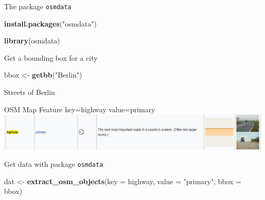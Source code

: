 \documentclass[
  ignorenonframetext,
]{beamer}
\newenvironment{Shaded}{\begin{snugshade}}{\end{snugshade}}
\newcommand{\DataTypeTok}[1]{\textcolor[rgb]{0.13,0.29,0.53}{#1}}
\newcommand{\KeywordTok}[1]{\textcolor[rgb]{0.13,0.29,0.53}{\textbf{#1}}}
\newcommand{\NormalTok}[1]{#1}
\newcommand{\StringTok}[1]{\textcolor[rgb]{0.31,0.60,0.02}{#1}}
\begin{document}
\begin{frame}[fragile]{The package \texttt{osmdata}}
\protect\hypertarget{the-package-osmdata}{}
\begin{Shaded}
\begin{Highlighting}[]
\KeywordTok{install.packages}\NormalTok{(}\StringTok{"osmdata"}\NormalTok{)}
\end{Highlighting}
\end{Shaded}

\begin{Shaded}
\begin{Highlighting}[]
\KeywordTok{library}\NormalTok{(osmdata)}
\end{Highlighting}
\end{Shaded}

\begin{block}{Get a bounding box for a city}
\protect\hypertarget{get-a-bounding-box-for-a-city}{}
\begin{Shaded}
\begin{Highlighting}[]
\NormalTok{bbox \textless{}{-}}\StringTok{ }\KeywordTok{getbb}\NormalTok{(}\StringTok{"Berlin"}\NormalTok{)}
\end{Highlighting}
\end{Shaded}
\end{block}
\end{frame}

\begin{frame}[fragile]{Streets of Berlin}
\protect\hypertarget{streets-of-berlin}{}
\begin{block}{OSM Map Feature key=highway value=primary}
\protect\hypertarget{osm-map-feature-keyhighway-valueprimary}{}
\includegraphics{pics/highway_primary_osmmapfeatures.PNG}
\end{block}

\begin{block}{Get data with package \texttt{osmdata}}
\protect\hypertarget{get-data-with-package-osmdata}{}
\begin{Shaded}
\begin{Highlighting}[]
\NormalTok{dat \textless{}{-}}\StringTok{ }\KeywordTok{extract\_osm\_objects}\NormalTok{(}\DataTypeTok{key =} \StringTok{\textquotesingle{}highway\textquotesingle{}}\NormalTok{,}
                              \DataTypeTok{value =} \StringTok{"primary"}\NormalTok{,}
                              \DataTypeTok{bbox =}\NormalTok{ bbox)}
\end{Highlighting}
\end{Shaded}
\end{block}
\end{frame}
\end{document}
